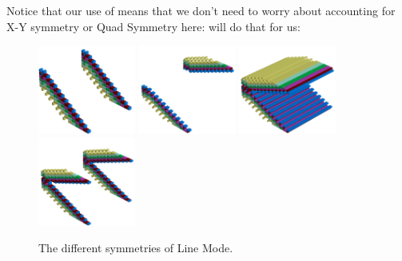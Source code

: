 Notice that our use of 
means that we don't need to worry about accounting for X-Y symmetry or Quad Symmetry here:  will do
that for us:
\begin{figure}[H]
    \centering
    \includegraphics[width=3.2cm]{linemode/symmetries/pattern1-0-45.png}%
    \includegraphics[width=3.2cm]{linemode/symmetries/pattern1-1-45.png}%
    \includegraphics[width=3.2cm]{linemode/symmetries/pattern1-3-45.png}%
    \includegraphics[width=3.2cm]{linemode/symmetries/pattern1-5-45.png}%
    \hspace{0.2cm}
    \caption{
      The different symmetries of Line Mode. 
      }
\end{figure}


\clearpage
